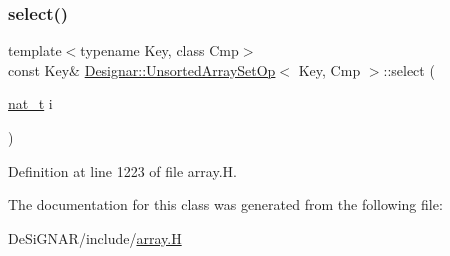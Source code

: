 \subsubsection{\texorpdfstring{select()}{select()}}
{\footnotesize\ttfamily template$<$typename Key, class Cmp$>$ \\
const Key\& \hyperlink{class_designar_1_1_unsorted_array_set_op}{Designar\+::\+Unsorted\+Array\+Set\+Op}$<$ Key, Cmp $>$\+::select (\begin{DoxyParamCaption}\item[{\hyperlink{namespace_designar_aa72662848b9f4815e7bf31a7cf3e33d1}{nat\+\_\+t}}]{i }\end{DoxyParamCaption})\hspace{0.3cm}{\ttfamily [inline]}}



Definition at line 1223 of file array.\+H.



The documentation for this class was generated from the following file\+:\begin{DoxyCompactItemize}
\item 
De\+Si\+G\+N\+A\+R/include/\hyperlink{array_8_h}{array.\+H}\end{DoxyCompactItemize}
